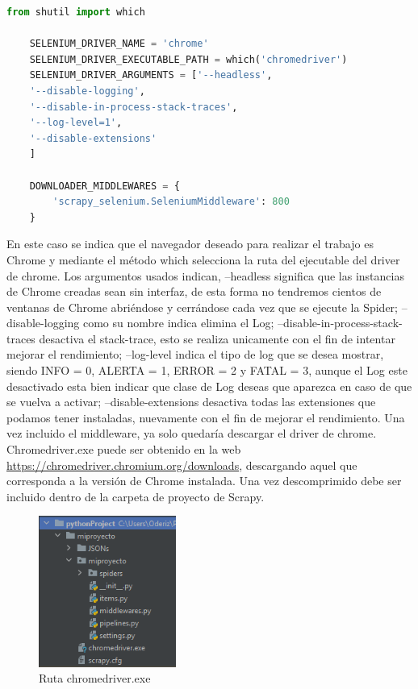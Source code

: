 \begin{lstlisting}[language=Python, caption={Agua en Navarra configuración Selenium}]
	from shutil import which
	
	SELENIUM_DRIVER_NAME = 'chrome'
	SELENIUM_DRIVER_EXECUTABLE_PATH = which('chromedriver')
	SELENIUM_DRIVER_ARGUMENTS = ['--headless',
	'--disable-logging',
	'--disable-in-process-stack-traces',
	'--log-level=1',
	'--disable-extensions'
	]
	
	DOWNLOADER_MIDDLEWARES = {
		'scrapy_selenium.SeleniumMiddleware': 800
	}
\end{lstlisting}

En este caso se indica que el navegador deseado para realizar el trabajo es Chrome y mediante el método which selecciona la ruta del ejecutable del driver de chrome.\newline
\newline
Los argumentos usados indican, --headless significa que las instancias de Chrome creadas sean sin interfaz, de esta forma no tendremos cientos de ventanas de Chrome abriéndose y cerrándose cada vez que se ejecute la Spider; --disable-logging como su nombre indica elimina el Log; --disable-in-process-stack-traces desactiva el stack-trace, esto se realiza unicamente con el fin de intentar mejorar el rendimiento; --log-level indica el tipo de log que se desea mostrar, siendo INFO = 0, ALERTA = 1, ERROR = 2 y FATAL = 3, aunque el Log este desactivado esta bien indicar que clase de Log deseas que aparezca en caso de que se vuelva a activar; --disable-extensions desactiva todas las extensiones que podamos tener instaladas, nuevamente con el fin de mejorar el rendimiento.\newline
\newline
Una vez incluido el middleware, ya solo quedaría descargar el driver de chrome.\newline
\newline
Chromedriver.exe puede ser obtenido en la web \url{https://chromedriver.chromium.org/downloads}, descargando aquel que corresponda a la versión de Chrome instalada. Una vez descomprimido debe ser incluido dentro de la carpeta de proyecto de Scrapy.

\begin{figure} [h!]
	\centering
	\includegraphics[width=0.4\textwidth]{fig/chromedriver.png}
	\caption[Ruta chromedriver.exe]{Ruta chromedriver.exe}
	\label{fig:ej15}
\end{figure}

